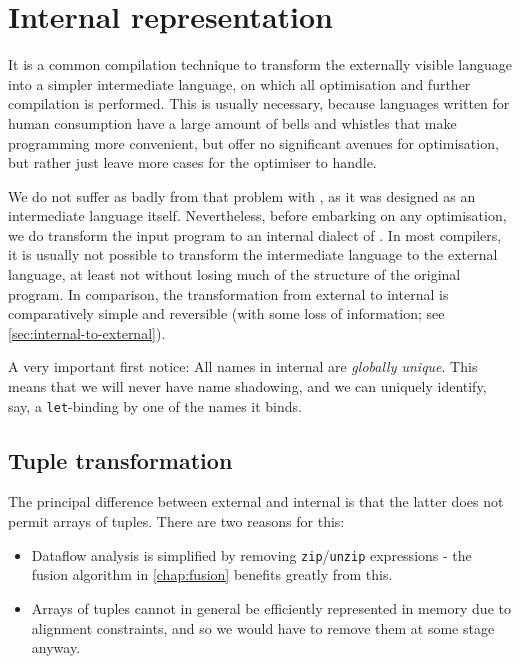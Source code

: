 \chapter{Internal representation}
\label{chap:internal}

It is a common compilation technique to transform the externally
visible language into a simpler intermediate language, on which all
optimisation and further compilation is performed.  This is usually
necessary, because languages written for human consumption have a
large amount of bells and whistles that make programming more
convenient, but offer no significant avenues for optimisation, but
rather just leave more cases for the optimiser to handle.

We do not suffer as badly from that problem with \LO{}, as it was
designed as an intermediate language itself.  Nevertheless, before
embarking on any optimisation, we do transform the input program to an
internal dialect of \LO{}.  In most compilers, it is usually not
possible to transform the intermediate language to the external
language, at least not without losing much of the structure of the
original program.  In comparison, the transformation from external to
internal \LO{} is comparatively simple and reversible (with some loss
of information; see \cref{sec:internal-to-external}).

A very important first notice: All names in internal \LO{} are
\textit{globally unique}.  This means that we will never have name
shadowing, and we can uniquely identify, say, a \texttt{let}-binding
by one of the names it binds.

\section{Tuple transformation}
\label{sec:tuple-transformation}

The principal difference between external and internal \LO{} is that
the latter does not permit arrays of tuples.  There are two reasons
for this:
\begin{itemize}
\item Dataflow analysis is simplified by removing
  \texttt{zip}/\texttt{unzip} expressions - the fusion algorithm in
  \cref{chap:fusion} benefits greatly from this.

\item Arrays of tuples cannot in general be efficiently represented in
  memory due to alignment constraints, and so we would have to remove
  them at some stage anyway.
\end{itemize}

